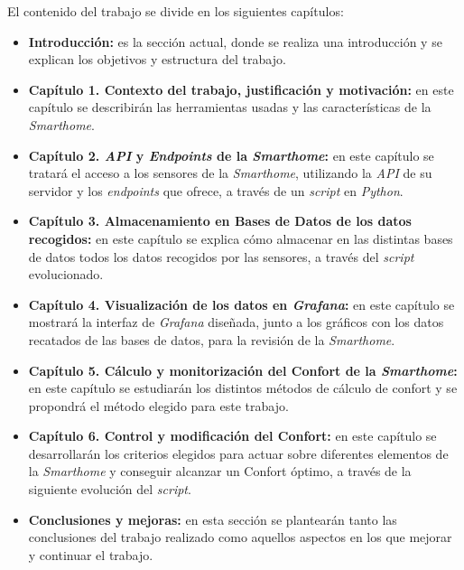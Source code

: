 El contenido del trabajo se divide en los siguientes capítulos:

\begin{itemize}
    \item \textbf{Introducción:} es la sección actual, donde se realiza una introducción y se explican los objetivos y estructura del trabajo.
    \item \textbf{Capítulo 1. Contexto del trabajo, justificación y motivación:} en este capítulo se describirán las herramientas usadas y las características de la \textit{Smarthome}.
    \item \textbf{Capítulo 2. \textit{API} y \textit{Endpoints} de la \textit{Smarthome}:} en este capítulo se tratará el acceso a los sensores de la \textit{Smarthome}, utilizando la \textit{API} de su servidor y los \textit{endpoints} que ofrece, a través de un \textit{script} en \textit{Python}.
    \item \textbf{Capítulo 3. Almacenamiento en Bases de Datos de los datos recogidos:} en este capítulo se explica cómo almacenar en las distintas bases de datos todos los datos recogidos por las sensores, a través del \textit{script} evolucionado.
    \item \textbf{Capítulo 4. Visualización de los datos en \textit{Grafana}:} en este capítulo se mostrará la interfaz de \textit{Grafana} diseñada, junto a los gráficos con los datos recatados de las bases de datos, para la revisión de la \textit{Smarthome}.
    \item \textbf{Capítulo 5. Cálculo y monitorización del Confort de la \textit{Smarthome}:} en este capítulo se estudiarán los distintos métodos de cálculo de confort y se propondrá el método elegido para este trabajo.
    \item \textbf{Capítulo 6. Control y modificación del Confort:} en este capítulo se desarrollarán los criterios elegidos para actuar sobre diferentes elementos de la \textit{Smarthome} y conseguir alcanzar un Confort óptimo, a través de la siguiente evolución del \textit{script}.
    \item \textbf{Conclusiones y mejoras:} en esta sección se plantearán tanto las conclusiones del trabajo realizado como aquellos aspectos en los que mejorar y continuar el trabajo.
\end{itemize}